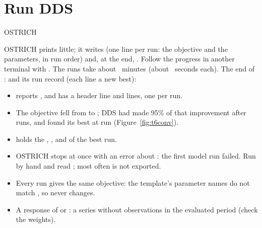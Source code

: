 \section{Run DDS}
\begin{shell}
$ $OSTRICH
\end{shell}
OSTRICH prints little; it writes  (one line per run: the objective and the parameters, in run order) and,
at the end, . Follow the progress in another terminal with . The
 runs take about ~minutes (about ~seconds each). The end of :
and its run record (each line a new best):
\begin{tocheck}
\begin{itemize}
\item {} reports , and  has a header line and  lines, one per run.
\item The objective fell from  to ; DDS had made 95\% of that improvement after
       runs, and found its best at run  (Figure~\ref{fig:t6conv}).
\item {} holds the , ,  and  of the best run.
\end{itemize}
\end{tocheck}
\begin{trouble}
\begin{itemize}
\item OSTRICH stops at once with an error about : the first model run failed. Run
       by hand and read ; most often  is not exported.
\item Every run gives the same objective: the template's parameter names do not match , so 
      never changes.
\item A response of  or : a series without observations in the evaluated period (check the weights).
\end{itemize}
\end{trouble}

